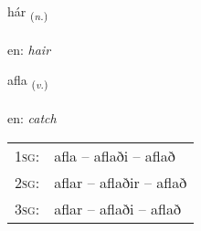 \documentclass[frontgrid, backgrid]{flacards}\usepackage[]{graphicx}\usepackage[]{color}
\begin{document}
\renewcommand{\flhead}{\vskip5pt \fboxsep=0pt {\small\bfseries\footnotesize Nafnorð | Noun}}
\renewcommand{\fcfoot}{\vskip5pt \fboxsep=0pt \hspace{2pt}{\small\bfseries\footnotesize 2K}}

\renewcommand{\blhead}{\vskip5pt {\small\bfseries\footnotesize Nafnorð | Noun }}
\renewcommand{\bcfoot}{\vskip5pt \hspace{2pt}{\small\bfseries\footnotesize 2K}}


{hár \small{\textsubscript{(\textit{n.})}} \\[1ex] %
\textphonetic{[hauːr]} \\
en: \emph{hair} \\  [2ex]
\renewcommand*{\arraystretch}{0.8}
}

\renewcommand{\flhead}{\vskip5pt \fboxsep=0pt {\small\bfseries\footnotesize Sagnorð | Verb}}
\renewcommand{\fcfoot}{\vskip5pt \fboxsep=0pt \hspace{2pt}{\small\bfseries\footnotesize 2K}}

\renewcommand{\blhead}{\vskip5pt {\small\bfseries\footnotesize Sagnorð | Verb }}
\renewcommand{\bcfoot}{\vskip5pt \hspace{2pt}{\small\bfseries\footnotesize 2K}}


{afla \small{\textsubscript{(\textit{v.})}} \\[1ex] %
\textphonetic{[apla]} \\
en: \emph{catch} \\  [2ex]
\renewcommand*{\arraystretch}{0.8}
\begin{tabular}{p{1cm}l}
\textsc{1sg}: & afla -- aflaði -- aflað \\ 
\textsc{2sg}: & aflar -- aflaðir -- aflað \\ 
\textsc{3sg}: & aflar -- aflaði -- aflað \\ 
\end{tabular}
}
\end{document}
